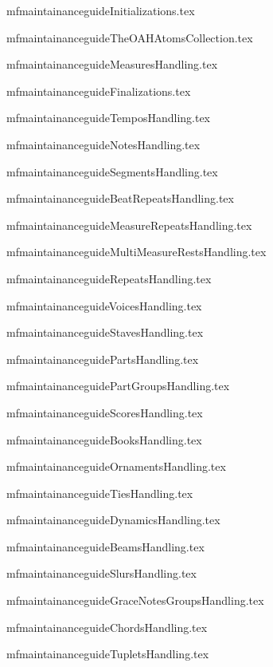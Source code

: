 \documentclass[11pt,a4paper]{report}
\begin{document}
{mfmaintainanceguideInitializations.tex}



{mfmaintainanceguideTheOAHAtomsCollection.tex}



{mfmaintainanceguideMeasuresHandling.tex}

{mfmaintainanceguideFinalizations.tex}

{mfmaintainanceguideTemposHandling.tex}

{mfmaintainanceguideNotesHandling.tex}

{mfmaintainanceguideSegmentsHandling.tex}

{mfmaintainanceguideBeatRepeatsHandling.tex}

{mfmaintainanceguideMeasureRepeatsHandling.tex}

{mfmaintainanceguideMultiMeasureRestsHandling.tex}

{mfmaintainanceguideRepeatsHandling.tex}

{mfmaintainanceguideVoicesHandling.tex}

{mfmaintainanceguideStavesHandling.tex}

{mfmaintainanceguidePartsHandling.tex}

{mfmaintainanceguidePartGroupsHandling.tex}

{mfmaintainanceguideScoresHandling.tex}

{mfmaintainanceguideBooksHandling.tex}

{mfmaintainanceguideOrnamentsHandling.tex}

{mfmaintainanceguideTiesHandling.tex}

{mfmaintainanceguideDynamicsHandling.tex}

{mfmaintainanceguideBeamsHandling.tex}

{mfmaintainanceguideSlursHandling.tex}

{mfmaintainanceguideGraceNotesGroupsHandling.tex}

{mfmaintainanceguideChordsHandling.tex}

{mfmaintainanceguideTupletsHandling.tex}
\end{document}

